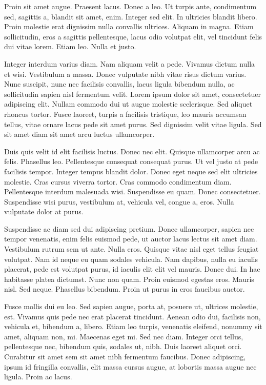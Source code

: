 \documentclass{article}
\begin{document}
Proin sit amet augue. Praesent lacus. Donec a leo. Ut turpis ante,
condimentum sed, sagittis a, blandit sit amet, enim. Integer sed elit. In
ultricies blandit libero. Proin molestie erat dignissim nulla convallis
ultrices. Aliquam in magna. Etiam sollicitudin, eros a sagittis pellentesque,
lacus odio volutpat elit, vel tincidunt felis dui vitae lorem. Etiam leo. Nulla
et justo.

Integer interdum varius diam. Nam aliquam velit a pede. Vivamus dictum
nulla et wisi. Vestibulum a massa. Donec vulputate nibh vitae risus dictum
varius. Nunc suscipit, nunc nec facilisis convallis, lacus ligula bibendum
nulla, ac sollicitudin sapien nisl fermentum velit. Lorem ipsum dolor sit amet,
consectetuer adipiscing elit. Nullam commodo dui ut augue molestie scelerisque.
Sed aliquet rhoncus tortor. Fusce laoreet, turpis a facilisis tristique, leo
mauris accumsan tellus, vitae ornare lacus pede sit amet purus. Sed dignissim
velit vitae ligula. Sed sit amet diam sit amet arcu luctus ullamcorper.

Duis quis velit id elit facilisis luctus. Donec nec elit. Quisque
ullamcorper arcu ac felis. Phasellus leo. Pellentesque consequat consequat
purus. Ut vel justo at pede facilisis tempor. Integer tempus blandit dolor.
Donec eget neque sed elit ultricies molestie. Cras cursus viverra tortor. Cras
commodo condimentum diam. Pellentesque interdum malesuada wisi. Suspendisse eu
quam. Donec consectetuer. Suspendisse wisi purus, vestibulum at, vehicula vel,
congue a, eros. Nulla vulputate dolor at purus.

Suspendisse ac diam sed dui adipiscing pretium. Donec ullamcorper, sapien
nec tempor venenatis, enim felis euismod pede, ut auctor lacus lectus sit amet
diam. Vestibulum rutrum sem ut ante. Nulla eros. Quisque vitae nisl eget tellus
feugiat volutpat. Nam id neque eu quam sodales vehicula. Nam dapibus,
nulla eu iaculis placerat, pede est volutpat purus, id iaculis elit elit vel mauris.
Donec dui. In hac habitasse platea dictumst. Nunc non quam. Proin euismod
egestas eros. Mauris nisl. Sed neque. Phasellus bibendum. Proin ut purus in
eros faucibus auctor.

Fusce mollis dui eu leo. Sed sapien augue, porta at, posuere ut, ultrices
molestie, est. Vivamus quis pede nec erat placerat tincidunt. Aenean odio dui,
facilisis non, vehicula et, bibendum a, libero. Etiam leo turpis, venenatis
eleifend, nonummy sit amet, aliquam non, mi. Maecenas eget mi. Sed nec diam.
Integer orci tellus, pellentesque nec, bibendum quis, sodales ut, nibh. Duis
laoreet aliquet orci. Curabitur sit amet sem sit amet nibh fermentum faucibus.
Donec adipiscing, ipsum id fringilla convallis, elit massa cursus augue, at
lobortis massa augue nec ligula. Proin ac lacus.
\end{document}
